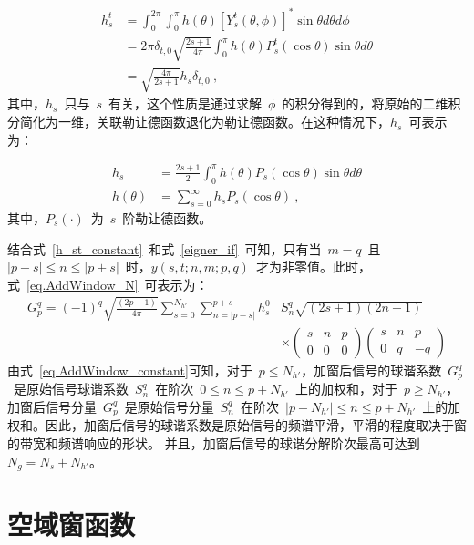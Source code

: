 \begin{align}\label{h_st_constant}
h_{s}^{t} & = \int_{0}^{2\pi}\int_{0}^{\pi} h(\theta) \left[Y_{s}^{t}(\theta,\phi) \right]^{*}\sin\theta d\theta d\phi \nonumber\\
& = 2\pi \delta_{t,0} \sqrt{\frac{2s+1}{4\pi}} \int_{0}^{\pi}h(\theta) P_{s}^{t}(\cos\theta)\sin\theta d\theta \nonumber\\
& = \sqrt{\frac{4\pi}{2s+1}}h_{s}\delta_{t,0}~,
\end{align}
其中，$h_{s}$~只与~$s$~有关，这个性质是通过求解~$\phi$~的积分得到的，将原始的二维积分简化为一维，关联勒让德函数退化为勒让德函数。在这种情况下，$h_{s}$~可表示为：

\begin{align}
h_{s} & = \frac{2s+1}{2}\int _{0}^{\pi}h(\theta)P_{s}(\cos\theta)\sin\theta d\theta \nonumber \\
h(\theta) & = \sum_{s=0}^{\infty} h_{s}P_{s}(\cos\theta)~,
\end{align}
其中，$P_{s}(\cdot)$~为~$s$~阶勒让德函数。

结合式~\eqref{h_st_constant}~和式~\eqref{eigner_if}~可知，只有当~$m = q$~且~$|p-s| \leq n \leq |p+s|$~时，$y(s,t;n,m;p,q)$~才为非零值。此时，式~\eqref{eq.AddWindow_N}~可表示为：
\begin{equation}\label{eq.AddWindow_constant}
\begin{aligned}
G_{p}^{q}=(-1)^{q} \sqrt{\frac{(2p+1)}{4 \pi}} \sum_{s=0}^{N_{h'}} \sum_{n=|p-s|}^{p+s} h_{s}^{0} & S_{n}^{q} \sqrt{(2 s+1)(2 n+1)} \\
& \times\left(\begin{array}{ccc}
s & n & p \\
0 & 0 & 0
\end{array}\right)\left(\begin{array}{ccc}
s & n & p \\
0 & q & -q
\end{array}\right)
\end{aligned}
\end{equation}
由式~\eqref{eq.AddWindow_constant}可知，对于~$p \leq N_{h'}$，加窗后信号的球谐系数~$G_{p}^{q}$~是原始信号球谐系数~$S_{n}^{q}$~在阶次~$0 \leq n \leq p+N_{h'}$~上的加权和，对于~$p \geq N_{h'}$，加窗后信号分量~$G_{p}^{q}$~是原始信号分量~$S_{n}^{q}$~在阶次~$\left|p -N_{h'} \right| \leq n \leq p + N_{h'}$~上的加权和。因此，加窗后信号的球谐系数是原始信号的频谱平滑，平滑的程度取决于窗的带宽和频谱响应的形状。
并且，加窗后信号的球谐分解阶次最高可达到~$N_{g}=N_{s}+N_{h'}$。


\section{空域窗函数}\label{sec.window}

